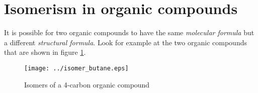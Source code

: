 



\section{Isomerism in organic compounds}
\label{sec:organic:isomer}

It is possible for two organic compounds to have the same \textit{molecular formula} but a different \textit{structural formula}. Look for example at the two organic compounds that are shown in figure \ref{fig:organic:butane}.

\begin{figure}[h]
\begin{center}
 \texttt{[image: ../isomer\_butane.eps]}
\end{center}


\caption{Isomers of a 4-carbon organic compound}
\label{fig:organic:butane}
\end{figure}

